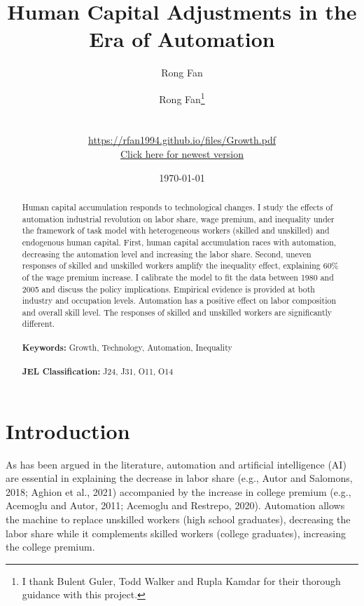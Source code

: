 \documentclass[12pt]{article}
\date{}
\author{Rong Fan}
\begin{document}
\begin{titlepage}
\title{Human Capital Adjustments in the Era of Automation}
\author{Rong Fan\thanks{I thank Bulent Guler, Todd Walker and Rupla Kamdar for their thorough guidance with this project.} 
\\
\\
\\ \href{https://rfan1994.github.io/files/Growth.pdf}{https://rfan1994.github.io/files/Growth.pdf}
\\ \href{https://rfan1994.github.io/files/Growth.pdf}{Click here for newest version}}
\date{\today}
\maketitle

\begin{abstract}
\noindent Human capital accumulation responds to technological changes. I study the effects of automation industrial revolution on labor share, wage premium, and inequality under the framework of task model with heterogeneous workers (skilled and unskilled) and endogenous human capital. First, human capital accumulation races with automation, decreasing the automation level and increasing the labor share. Second, uneven responses of skilled and unskilled workers amplify the inequality effect, explaining 60\% of the wage premium increase. I calibrate the model to fit the data between 1980 and 2005 and discuss the policy implications. Empirical evidence is provided at both industry and occupation levels. Automation has a positive effect on labor composition and overall skill level. The responses of skilled and unskilled workers are significantly different. \\
\vspace{0in}\\
\noindent\textbf{Keywords:} Growth, Technology, Automation, Inequality\\
\vspace{0in}\\
\noindent\textbf{JEL Classification: } J24, J31, O11, O14\\

\bigskip
\end{abstract}
\setcounter{page}{0}
\thispagestyle{empty}
\end{titlepage}
\pagebreak \newpage

\section{Introduction}
As has been argued in the literature, automation and artificial intelligence (AI) are essential in explaining the decrease in labor share (e.g., Autor and Salomons, 2018\cite{AutorSalomons2018}; Aghion et al., 2021\nocite{Aghionetal2021}) accompanied by the increase in college premium (e.g., Acemoglu and Autor, 2011\nocite{AcemogluAutor2011}; Acemoglu and Restrepo, 2020\nocite{AcemogluRestrepo2020}). Automation allows the machine to replace unskilled workers (high school graduates), decreasing the labor share while it complements skilled workers (college graduates), increasing the college premium.
\end{document}
